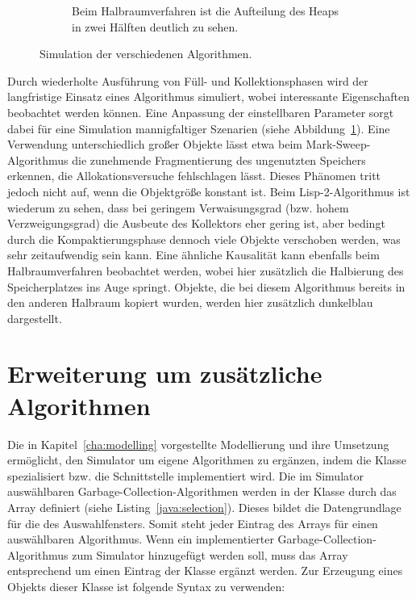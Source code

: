 \begin{figure}[p]
\begin{subfigure}{\textwidth}
		\caption{Beim Halbraumverfahren ist die Aufteilung des Heaps in zwei Hälften deutlich zu sehen.}
	\end{subfigure}
	\caption[Simulation der verschiedenen Algorithmen]{Simulation der verschiedenen Algorithmen.}
	\label{fig:simulation}
\end{figure}

Durch wiederholte Ausführung von Füll- und Kollektionsphasen wird der langfristige Einsatz eines Algorithmus simuliert, wobei interessante Eigenschaften beobachtet werden können.
Eine Anpassung der einstellbaren Parameter sorgt dabei für eine Simulation mannigfaltiger Szenarien (siehe Abbildung~\ref{fig:simulation}).
Eine Verwendung unterschiedlich großer Objekte lässt etwa beim Mark-Sweep-Algorithmus die zunehmende Fragmentierung des ungenutzten Speichers erkennen, die Allokationsversuche fehlschlagen lässt.
Dieses Phänomen tritt jedoch nicht auf, wenn die Objektgröße konstant ist.
Beim Lisp-2-Algorithmus ist wiederum zu sehen, dass bei geringem Verwaisungsgrad (bzw. hohem Verzweigungsgrad) die Ausbeute des Kollektors eher gering ist, aber bedingt durch die Kompaktierungsphase dennoch viele Objekte verschoben werden, was sehr zeitaufwendig sein kann.
Eine ähnliche Kausalität kann ebenfalls beim Halbraumverfahren beobachtet werden, wobei hier zusätzlich die Halbierung des Speicherplatzes ins Auge springt.
Objekte, die bei diesem Algorithmus bereits in den anderen Halbraum kopiert wurden, werden hier zusätzlich dunkelblau dargestellt.

\section{Erweiterung um zusätzliche Algorithmen}
\label{sec:extension}
Die in Kapitel~\ref{cha:modelling} vorgestellte Modellierung und ihre Umsetzung ermöglicht, den Simulator um eigene Algorithmen zu ergänzen, indem die Klasse  spezialisiert bzw. die Schnittstelle  implementiert wird.
Die im Simulator auswählbaren Garbage-Collection-Algorithmen werden in der Klasse  durch das Array  definiert (siehe Listing~\ref{java:selection}).
Dieses bildet die Datengrundlage für die  des Auswahlfensters.
Somit steht jeder Eintrag des Arrays für einen auswählbaren Algorithmus.
Wenn ein implementierter Garbage-Collection-Algorithmus zum Simulator hinzugefügt werden soll, muss das Array entsprechend um einen Eintrag der Klasse  ergänzt werden.
Zur Erzeugung eines Objekts dieser Klasse ist folgende Syntax zu verwenden:

